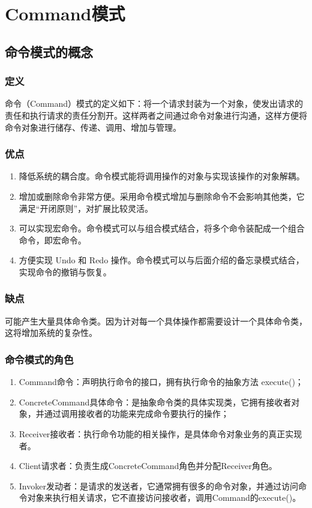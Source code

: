 \chapter{Command模式}
\section{命令模式的概念}
\subsection{定义}
命令（Command）模式的定义如下：将一个请求封装为一个对象，使发出请求的责任和执行请求的责任分割开。这样两者之间通过命令对象进行沟通，这样方便将命令对象进行储存、传递、调用、增加与管理。
\subsection{优点}
\begin{enumerate}
	\item 降低系统的耦合度。命令模式能将调用操作的对象与实现该操作的对象解耦。
	\item 增加或删除命令非常方便。采用命令模式增加与删除命令不会影响其他类，它满足“开闭原则”，对扩展比较灵活。
	\item 可以实现宏命令。命令模式可以与组合模式结合，将多个命令装配成一个组合命令，即宏命令。
	\item 方便实现 Undo 和 Redo 操作。命令模式可以与后面介绍的备忘录模式结合，实现命令的撤销与恢复。
\end{enumerate}
\subsection{缺点}
可能产生大量具体命令类。因为计对每一个具体操作都需要设计一个具体命令类，这将增加系统的复杂性。
\subsection{命令模式的角色}
\begin{enumerate}
	\item Command命令：声明执行命令的接口，拥有执行命令的抽象方法 execute()；
	\item ConcreteCommand具体命令：是抽象命令类的具体实现类，它拥有接收者对象，并通过调用接收者的功能来完成命令要执行的操作；
	\item Receiver接收者：执行命令功能的相关操作，是具体命令对象业务的真正实现者。
	\item Client请求者：负责生成ConcreteCommand角色并分配Receiver角色。
	\item Invoker发动者：是请求的发送者，它通常拥有很多的命令对象，并通过访问命令对象来执行相关请求，它不直接访问接收者，调用Command的execute()。
\end{enumerate}
